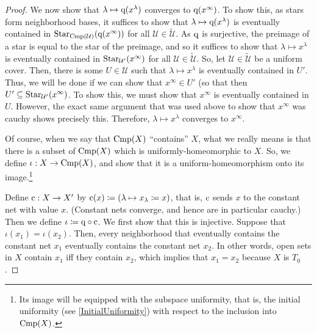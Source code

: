 \begin{thm}[Completion]
\begin{savenotes}
\begin{proof}
We now show that $\lambda \mapsto \mathrm{q} (x^\lambda )$ converges to $\mathrm{q} (x^\infty )$.  To show this, as stars form neighborhood bases, it suffices to show that $\lambda \mapsto \mathrm{q} (x^\lambda )$ is eventually contained in $\operatorname{Star} _{\operatorname{Cmp} (\mathcal{U})}(\mathrm{q} (x^\infty ))$ for all $\mathcal{U}\in \widetilde{\mathcal{U}}$.  As $\mathrm{q}$ is surjective, the preimage of a star is equal to the star of the preimage, and so it suffices to show that $\lambda \mapsto x^\lambda$ is eventually contained in $\operatorname{Star} _{\mathcal{U}'}(x^\infty )$ for all $\mathcal{U}\in \widetilde{\mathcal{U}}$.  So, let $\mathcal{U}\in \widetilde{\mathcal{U}}$ be a uniform cover.  Then, there is some $U\in \mathcal{U}$ such that $\lambda \mapsto x^\lambda$ is eventually contained in $U'$.  Thus, we will be done if we can show that $x^\infty \in U'$ (so that then $U'\subseteq \operatorname{Star} _{\mathcal{U}'}(x^\infty )$.  To show this, we must show that $x^\infty$ is eventually contained in $U$.  However, the exact same argument that was used above to show that $x^\infty$ was cauchy shows precisely this.  Therefore, $\lambda \mapsto x^\lambda$ converges to $x^\infty$.

Of course, when we say that $\operatorname{Cmp} (X)$ ``contains'' $X$, what we really means is that there is a subset of $\operatorname{Cmp} (X)$ which is uniformly-homeomorphic to $X$.  So, we define $\iota :X\rightarrow \operatorname{Cmp} (X)$, and show that it is a uniform-homeomorphism onto its image.\footnote{Its image will be equipped with the subspace uniformity, that is, the initial uniformity (see \cref{InitialUniformity}) with respect to the inclusion into $\operatorname{Cmp} (X)$.}

Define $\mathrm{c} :X\rightarrow X'$ by $\mathrm{c} (x)\coloneqq (\lambda \mapsto x_\lambda \coloneqq x)$, that is, $\mathrm{c}$ sends $x$ to the constant net with value $x$.  (Constant nets converge, and hence are in particular cauchy.)  Then we define $\iota \coloneqq \mathrm{q} \circ \mathrm{c}$.  We first show that this is injective.  Suppose that $\iota (x_1)=\iota (x_2)$.  Then, every neighborhood that eventually contains the constant net $x_1$ eventually contains the constant net $x_2$.  In other words, open sets in $X$ contain $x_1$ iff they contain $x_2$, which implies that $x_1=x_2$ because $X$ is $T_0$.


\end{proof}
\end{savenotes}
\end{thm}
